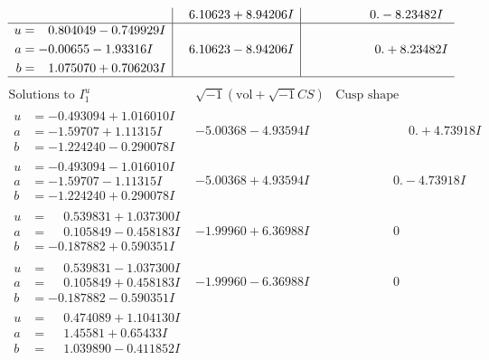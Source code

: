 \documentclass[1p]{elsarticle_modified}
\theoremstyle{definition}
\newcommand{\I}{\sqrt{-1}}
\begin{document}
$$\begin{array}{c|c|c}
 & \phantom{-}6.10623 + 8.94206 I & \phantom{-0.000000 } 0. - 8.23482 I \\ \hline\begin{aligned}
u &= \phantom{-}0.804049 - 0.749929 I \\
a &= -0.00655 - 1.93316 I \\
b &= \phantom{-}1.075070 + 0.706203 I\end{aligned}
 & \phantom{-}6.10623 - 8.94206 I & \phantom{-0.000000 -}0. + 8.23482 I\\
 \hline 
 \end{array}$$\newpage$$\begin{array}{c|c|c}  
\text{Solutions to }I^u_{1}& \I (\text{vol} + \sqrt{-1}CS) & \text{Cusp shape}\\
 \hline 
\begin{aligned}
u &= -0.493094 + 1.016010 I \\
a &= -1.59707 + 1.11315 I \\
b &= -1.224240 - 0.290078 I\end{aligned}
 & -5.00368 - 4.93594 I & \phantom{-0.000000 -}0. + 4.73918 I \\ \hline\begin{aligned}
u &= -0.493094 - 1.016010 I \\
a &= -1.59707 - 1.11315 I \\
b &= -1.224240 + 0.290078 I\end{aligned}
 & -5.00368 + 4.93594 I & \phantom{-0.000000 } 0. - 4.73918 I \\ \hline\begin{aligned}
u &= \phantom{-}0.539831 + 1.037300 I \\
a &= \phantom{-}0.105849 - 0.458183 I \\
b &= -0.187882 + 0.590351 I\end{aligned}
 & -1.99960 + 6.36988 I & \phantom{-0.000000 } 0 \\ \hline\begin{aligned}
u &= \phantom{-}0.539831 - 1.037300 I \\
a &= \phantom{-}0.105849 + 0.458183 I \\
b &= -0.187882 - 0.590351 I\end{aligned}
 & -1.99960 - 6.36988 I & \phantom{-0.000000 } 0 \\ \hline\begin{aligned}
u &= \phantom{-}0.474089 + 1.104130 I \\
a &= \phantom{-}1.45581 + 0.65433 I \\
b &= \phantom{-}1.039890 - 0.411852 I\end{aligned}

\end{array}$$
\end{document}
